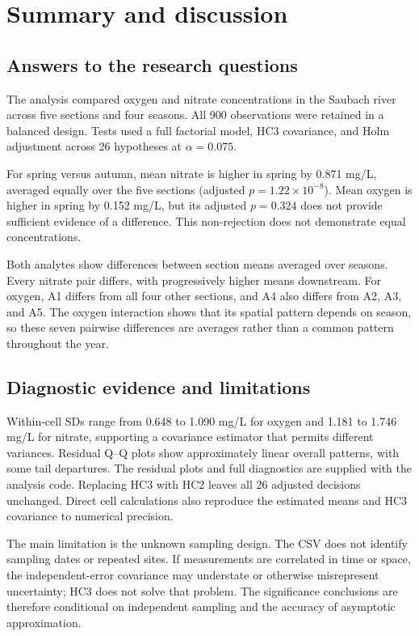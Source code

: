 \section{Summary and discussion}\label{sec:summary}
\subsection{Answers to the research questions}
The analysis compared oxygen and nitrate concentrations in the Saubach river across five sections and four seasons. All 900 observations were retained in a balanced design. Tests used a full factorial model, HC3 covariance, and Holm adjustment across 26 hypotheses at $\alpha=0.075$.

For spring versus autumn, mean nitrate is higher in spring by 0.871 mg/L, averaged equally over the five sections (adjusted $p=1.22\times10^{-8}$). Mean oxygen is higher in spring by 0.152 mg/L, but its adjusted $p=0.324$ does not provide sufficient evidence of a difference. This non-rejection does not demonstrate equal concentrations.

Both analytes show differences between section means averaged over seasons. Every nitrate pair differs, with progressively higher means downstream. For oxygen, A1 differs from all four other sections, and A4 also differs from A2, A3, and A5. The oxygen interaction shows that its spatial pattern depends on season, so these seven pairwise differences are averages rather than a common pattern throughout the year.

\subsection{Diagnostic evidence and limitations}
Within-cell SDs range from 0.648 to 1.090 mg/L for oxygen and 1.181 to 1.746 mg/L for nitrate, supporting a covariance estimator that permits different variances. Residual Q--Q plots show approximately linear overall patterns, with some tail departures. The residual plots and full diagnostics are supplied with the analysis code. Replacing HC3 with HC2 leaves all 26 adjusted decisions unchanged. Direct cell calculations also reproduce the estimated means and HC3 covariance to numerical precision.

The main limitation is the unknown sampling design. The CSV does not identify sampling dates or repeated sites. If measurements are correlated in time or space, the independent-error covariance may understate or otherwise misrepresent uncertainty; HC3 does not solve that problem. The significance conclusions are therefore conditional on independent sampling and the accuracy of asymptotic approximation.

